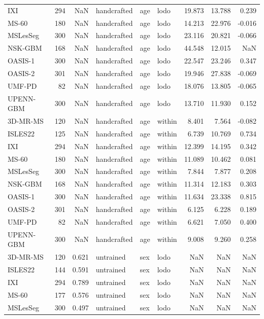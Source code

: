 \begin{tabular}{lrrlllrrr}
IXI & 294 & NaN & handcrafted & age & lodo & 19.873 & 13.788 & 0.239 \\
MS-60 & 180 & NaN & handcrafted & age & lodo & 14.213 & 22.976 & -0.016 \\
MSLesSeg & 300 & NaN & handcrafted & age & lodo & 23.116 & 20.821 & -0.066 \\
NSK-GBM & 168 & NaN & handcrafted & age & lodo & 44.548 & 12.015 & NaN \\
OASIS-1 & 300 & NaN & handcrafted & age & lodo & 22.547 & 23.246 & 0.347 \\
OASIS-2 & 301 & NaN & handcrafted & age & lodo & 19.946 & 27.838 & -0.069 \\
UMF-PD & 82 & NaN & handcrafted & age & lodo & 18.076 & 13.805 & -0.065 \\
UPENN-GBM & 300 & NaN & handcrafted & age & lodo & 13.710 & 11.930 & 0.152 \\
3D-MR-MS & 120 & NaN & handcrafted & age & within & 8.401 & 7.564 & -0.082 \\
ISLES22 & 125 & NaN & handcrafted & age & within & 6.739 & 10.769 & 0.734 \\
IXI & 294 & NaN & handcrafted & age & within & 12.399 & 14.195 & 0.342 \\
MS-60 & 180 & NaN & handcrafted & age & within & 11.089 & 10.462 & 0.081 \\
MSLesSeg & 300 & NaN & handcrafted & age & within & 7.844 & 7.877 & 0.208 \\
NSK-GBM & 168 & NaN & handcrafted & age & within & 11.314 & 12.183 & 0.303 \\
OASIS-1 & 300 & NaN & handcrafted & age & within & 11.634 & 23.338 & 0.815 \\
OASIS-2 & 301 & NaN & handcrafted & age & within & 6.125 & 6.228 & 0.189 \\
UMF-PD & 82 & NaN & handcrafted & age & within & 6.621 & 7.050 & 0.400 \\
UPENN-GBM & 300 & NaN & handcrafted & age & within & 9.008 & 9.260 & 0.258 \\
3D-MR-MS & 120 & 0.621 & untrained & sex & lodo & NaN & NaN & NaN \\
ISLES22 & 144 & 0.591 & untrained & sex & lodo & NaN & NaN & NaN \\
IXI & 294 & 0.789 & untrained & sex & lodo & NaN & NaN & NaN \\
MS-60 & 177 & 0.576 & untrained & sex & lodo & NaN & NaN & NaN \\
MSLesSeg & 300 & 0.497 & untrained & sex & lodo & NaN & NaN & NaN \\

\end{tabular}
